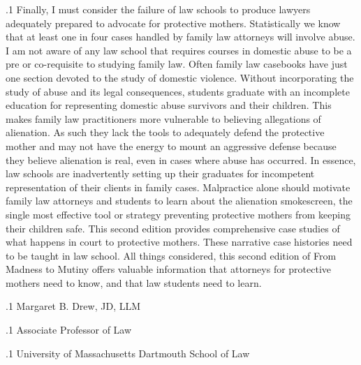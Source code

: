 \documentclass[11pt, twoside]{article}
\begin{document}
{\p.1{%
Finally, I must consider the failure of law schools to produce lawyers
adequately prepared to advocate for protective mothers. Statistically we
know that at least one in four cases handled by family law attorneys will
involve abuse. I am not aware of any law school that requires courses
in domestic abuse to be a pre or co-requisite to studying family law.
Often family law casebooks have just one section devoted to the study
of domestic violence. Without incorporating the study of abuse and
its legal consequences, students graduate with an incomplete education for representing domestic abuse survivors and their children. This
makes family law practitioners more vulnerable to believing allegations
of alienation. As such they lack the tools to adequately defend the protective mother and may not have the energy to mount an aggressive
defense because they believe alienation is real, even in cases where abuse
has occurred. In essence, law schools are inadvertently setting up their
graduates for incompetent representation of their clients in family cases.
Malpractice alone should motivate family law attorneys and students to
learn about the alienation smokescreen, the single most effective tool or
strategy preventing protective mothers from keeping their children safe.
This second edition provides comprehensive case studies of what happens in court to protective mothers. These narrative case histories need
to be taught in law school. All things considered, this second edition of
From Madness to Mutiny offers valuable information that attorneys for
protective mothers need to know, and that law students need to learn.
}%

\p.1{%
\hfill{}Margaret B. Drew, JD, LLM
}%

\p.1{%
\hfill{}Associate Professor of Law
}%

\p.1{%
\hfill{}University of Massachusetts Dartmouth School of Law
}%





}
\end{document}
